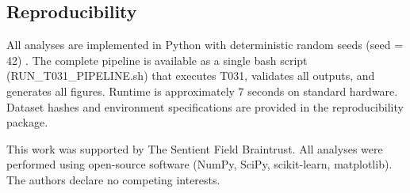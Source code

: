 \documentclass[aip,chaos,showpacs,superscriptaddress,groupedaddress]{revtex4-1}
\begin{document}
\subsection{Reproducibility}

All analyses are implemented in Python with deterministic random seeds (seed = 42) \cite{schreiber1999interdisciplinary}. The complete pipeline is available as a single bash script (RUN\_T031\_PIPELINE.sh) that executes T031, validates all outputs, and generates all figures. Runtime is approximately 7 seconds on standard hardware. Dataset hashes and environment specifications are provided in the reproducibility package.

\begin{acknowledgments}
This work was supported by The Sentient Field Braintrust. All analyses were performed using open-source software (NumPy, SciPy, scikit-learn, matplotlib). The authors declare no competing interests.
\end{acknowledgments}


\end{document}
